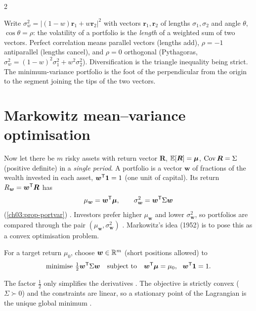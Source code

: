 \begin{paracol}{2}
\begin{intuition}
Write $\sigma_w^2=|(1-w)\bm r_1+w\bm r_2|^2$ with vectors $\bm r_1,\bm r_2$ of lengths $\sigma_1,\sigma_2$ and
angle $\theta$, $\cos\theta=\rho$: the volatility of a portfolio is the \emph{length} of a weighted sum of two
vectors. Perfect correlation means parallel vectors (lengths add), $\rho=-1$ antiparallel (lengths cancel), and $\rho=0$
orthogonal (Pythagoras, $\sigma_w^2=(1-w)^2\sigma_1^2+w^2\sigma_2^2$). Diversification is the triangle inequality
being strict. The minimum-variance portfolio is the foot of the perpendicular from the origin to the segment
joining the tips of the two vectors.
\end{intuition}


\section{Markowitz mean--variance optimisation}\label{ch10:sec-mvo}

Now let there be $m$ risky assets with return vector $\bm R$, $\mathbb{E}[\bm R]=\bm\mu$, $\operatorname{Cov}\bm R=\Sigma$ (positive
definite) in a \emph{single period}. A portfolio is a vector $\bm w$ of fractions of the wealth invested in each
asset, $\bm w^{\mathsf T}\bm 1=1$ (one unit of capital). Its return $R_{\bm w}=\bm w^{\mathsf T}\bm R$ has
\begin{equation}\label{ch10:eq-mv}
  \mu_{\bm w}=\bm w^{\mathsf T}\bm\mu,\qquad \sigma_{\bm w}^2=\bm w^{\mathsf T}\Sigma\bm w
\end{equation}
(\cref{ch03:prop-portvar}) . Investors prefer higher $\mu_{\bm w}$ and lower
$\sigma^2_{\bm w}$, so portfolios are compared through the pair $(\mu_{\bm w},\sigma_{\bm w}^2)$
. Markowitz's idea (1952) is to pose this as a convex optimisation problem.

\begin{definition}\label{ch10:def-markowitz}
For a target return $\mu_0$, choose $\bm w\in\mathbb{R}^m$ (short positions allowed) to
\[
  \text{minimise } \tfrac12\bm w^{\mathsf T}\Sigma\bm w\quad\text{subject to}\quad \bm w^{\mathsf T}\bm\mu=\mu_0,\ \ \bm w^{\mathsf T}\bm 1=1 .
\]
\end{definition}
The factor $\frac12$ only simplifies the derivatives . The objective is strictly convex ($\Sigma\succ0$)
and the constraints are linear, so a stationary point of the Lagrangian is the unique global minimum
.


\end{paracol}
